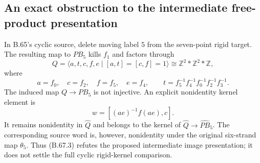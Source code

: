 \subsection*{An exact obstruction to the intermediate free-product presentation}

In B.65's cyclic source, delete moving label $5$ from the
seven-point rigid target.  The resulting map to $PB_5$
kills $f_1$ and factors through
\[
 Q=\langle a,t,c,f,e\mid[a,t]=[c,f]=1\rangle
       \cong\mathbb Z^2*\mathbb Z^2*\mathbb Z,
                                                               \tag{B.67.1}
\]
where
\[
 a=f_0,\quad c=f_2,\quad f=f_5,\quad e=f_4,
 \qquad t=f_5^{-1}f_4^{-1}f_0^{-1}f_2^{-1}f_3^{-1}.
                                                               \tag{B.67.2}
\]
The induced map $Q\to PB_5$ is not injective.
An explicit nonidentity kernel element is
\[
       w=[(ae)^{-1}f(ae),c].
                                                               \tag{B.67.3}
\]
It remains nonidentity in $\widehat Q$ and belongs to
the kernel of $\widehat Q\to\widehat{PB}_5$.
The corresponding source word is, however, nonidentity
under the original six-strand map $\theta_5$.
Thus (B.67.3) refutes the proposed intermediate image
presentation; it does not settle the full cyclic
rigid-kernel comparison.

